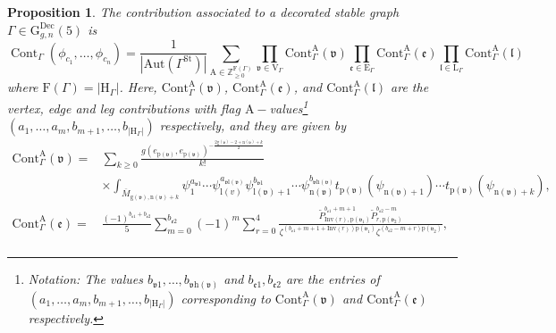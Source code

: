 \documentclass[10pt,a4paper]{amsart}
\newtheorem{prop}{Proposition}
\begin{document}
\begin{prop}\label{prop:contributions}
The contribution associated to a decorated stable graph $\Gamma\in\mathrm{G}_{g,n}^{\text{Dec}}(5)$ is
\begin{equation*}
\operatorname{Cont}_{\Gamma}\left(\phi_{c_{1}}, \ldots, \phi_{c_{n}}\right)=\frac{1}{|\mathrm{Aut}(\Gamma^{\mathrm{St}})|} \sum_{\mathrm{A} \in \mathbb{Z}_{\geq 0}^{\mathrm{F}(\Gamma)}} \prod_{\mathfrak{v} \in \mathrm{V}_{\Gamma}} \mathrm{Cont}_{\Gamma}^{\mathrm{A}}(\mathfrak{v}) \prod_{\mathfrak{e}\in \mathrm{E}_{\Gamma}} \mathrm{Cont}_{\Gamma}^{\mathrm{A}}(\mathfrak{e}) \prod_{\mathfrak{l} \in \mathrm{L}_{\Gamma}} \mathrm{Cont}_{\Gamma}^{\mathrm{A}}(\mathfrak{l})
\end{equation*}
where $\mathrm{F}(\Gamma)=\left\vert\mathrm{H}_{\Gamma}\right\vert$. Here, $\mathrm{Cont}_{\Gamma}^{\mathrm{A}}(\mathfrak{v})$, $\mathrm{Cont}_{\Gamma}^{\mathrm{A}}(\mathfrak{e})$, and $\mathrm{Cont}_{\Gamma}^{\mathrm{A}}(\mathfrak{l})$ are the {\em vertex}, {\em edge} and {\em leg} contributions with flag $\mathrm{A}-$values\footnote{Notation: The values ${b_{\mathfrak{v}1}},\ldots,{b_{\mathfrak{v}\mathrm{h}(\mathfrak{v})}}$ and $b_{\mathfrak{e}1},b_{\mathfrak{e}2}$ are the entries of $(a_1,\ldots,a_m,b_{m+1},\ldots,b_{\left\vert\mathrm{H}_{\Gamma}\right\vert})$ corresponding to $\mathrm{Cont}_{\Gamma}^{\mathrm{A}}(\mathfrak{v})$ and $\mathrm{Cont}_{\Gamma}^{\mathrm{A}}(\mathfrak{e})$ respectively.} $(a_1,\ldots,a_m,b_{m+1},\ldots,b_{\left\vert\mathrm{H}_{\Gamma}\right\vert})$ respectively, and they are given by
\begin{equation*}
\begin{aligned}
    \mathrm{Cont}_{\Gamma}^{\mathrm{A}}(\mathfrak{v})
    =&\sum_{k \geq 0} \frac{g({e}_{\mathrm{p}(\mathfrak{v})},{e}_{\mathrm{p}(\mathfrak{v})})^{-\frac{2\mathrm{g}(\mathfrak{v})-2+\mathrm{n}(\mathfrak{v})+k}{2}}}{k !}\\
    &\times\int_{\overline{M}_{\mathrm{g}(\mathfrak{v}),\mathrm{n}(\mathfrak{v})+k}}\psi_1^{a_{\mathfrak{v}1}}\cdots\psi_{\mathrm{l}(v)}^{a_{\mathfrak{v}\mathrm{l}(\mathfrak{v})}}\psi_{\mathrm{l}(\mathfrak{v})+1}^{b_{\mathfrak{v}1}}\cdots\psi_{\mathrm{n}(\mathfrak{v})}^{b_{\mathfrak{v}\mathrm{h}(\mathfrak{v})}}t_{\mathrm{p}(\mathfrak{v})}(\psi_{\mathrm{n}(\mathfrak{v})+1})\cdots t_{\mathrm{p}(\mathfrak{v})}(\psi_{\mathrm{n}(\mathfrak{v})+k}),\\
    \mathrm{Cont}_{\Gamma}^{\mathrm{A}}(\mathfrak{e})
    =&\frac{(-1)^{b_{\mathfrak{e}1}+b_{\mathfrak{e}2}}}{5} \sum_{m=0}^{b_{\mathfrak{e}2}}(-1)^{m} \sum_{r=0}^{4}\frac{\widetilde{P}_{\mathrm{Inv}(r),\mathrm{p}(\mathfrak{v}_1)}^{b_{\mathfrak{e}1}+m+1}\widetilde{P}_{r,\mathrm{p}(\mathfrak{v}_2)}^{b_{\mathfrak{e}2}-m}}{\zeta^{(b_{\mathfrak{e}1}+m+1+\mathrm{Inv}(r))\mathrm{p}(\mathfrak{v}_1)}\zeta^{(b_{\mathfrak{e}2}-m+r)\mathrm{p}(\mathfrak{v}_2)}},\\

\end{aligned}
\end{equation*}
\end{prop}
\end{document}
